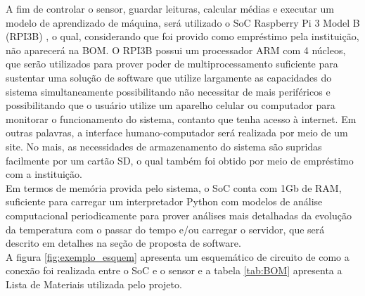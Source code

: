 A fim de controlar o sensor, guardar leituras, calcular médias e executar um modelo de aprendizado de máquina, será utilizado o SoC Raspberry Pi 3 Model B (RPI3B) \cite{rpi3}, o qual, considerando que foi provido como empréstimo pela instituição, não aparecerá na BOM. O RPI3B possui um processador ARM com 4 núcleos, que serão utilizados para prover poder de multiprocessamento suficiente para sustentar uma solução de software que utilize largamente as capacidades do sistema simultaneamente possibilitando não necessitar de mais periféricos e possibilitando que o usuário utilize um aparelho celular ou computador para monitorar o funcionamento do sistema, contanto que tenha acesso à internet. Em outras palavras, a interface humano-computador será realizada por meio de um site. No mais, as necessidades de armazenamento do sistema são supridas facilmente por um cartão SD, o qual também foi obtido por meio de empréstimo com a instituição.\\

Em termos de memória provida pelo sistema, o SoC conta com 1Gb de RAM, suficiente para carregar um interpretador Python com modelos de análise computacional periodicamente para prover análises mais detalhadas da evolução da temperatura com o passar do tempo e/ou carregar o servidor, que será descrito em detalhes na seção de proposta de software.\\


A figura \ref{fig:exemplo_esquem} apresenta um esquemático de circuito de como a conexão foi realizada entre o SoC e o sensor e a tabela \ref{tab:BOM} apresenta a Lista de Materiais utilizada pelo projeto. 



